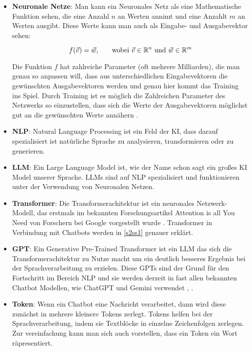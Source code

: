 	\begin{itemize}
		\item \textbf{Neuronale Netze}: Man kann ein Neuronales Netz als eine Mathematische Funktion sehen,
		die eine Anzahl $n$ an Werten annimt und eine Anzahlt $m$ an Werten ausgibt. Diese Werte kann man auch als Eingabe-
		und Ausgabevektor sehen: 		
		
		\begin{equation}\label{nueral_network_function}	
			f(\vec{v}) = \vec{w}\textnormal{,\qquad wobei } \vec{v} \in \mathbb{R}^n \textnormal{ und } \vec{w} \in \mathbb{R}^m
		\end{equation}  
		\vspace{0.0cm}
		
		Die Funktion $f$ hat zahlreiche Parameter (oft mehrere Milliarden), die man genau so anpassen will, dass aus unterschiedlichen 
		Eingabevektoren die gewünschten Ausgabevektoren werden und genau hier kommt das Training ins Spiel. Durch
		Training ist es möglich die Zahlreichen Parameter des Netzwerks so einzustellen, dass sich die Werte der 
		Ausgabevektoren möglichst gut an die gewünschten Werte annähern \cite[S. 4f]{aggarwal2018}.  
		
		\item \textbf{NLP}: Natural Language Processing ist ein Feld der KI, dass darauf spezialisiert ist natürliche 
		Sprache zu analysieren, transformieren oder zu generieren.  
		
		\item \textbf{LLM}: Ein Large Language Model ist, wie der Name schon sagt ein großes KI Model unserer Sprache.
		LLMs sind auf NLP spezialisiert und funktionieren unter der Verwendung von Neuronalen Netzen.

		\item \textbf{Transformer}: Die Transformerachitektur ist ein neuronales Netzwerk-Modell, das erstmals im 
		bekannten Forschungsartikel \glqq{}Attention is all You Need\grqq{} von Forschern bei Google vorgestellt wurde 
		\cite{vaswani2017}. Transformer in Verbindung mit Chatbots werden in \ref{s2ss1} genauer erklärt.
		
		\item \textbf{GPT}: Ein Generative Pre-Trained Transformer ist ein LLM das sich die Transformerachitektur 
		zu Nutze macht um ein deutlich besseres Ergebnis bei der Sprachverarbeitung zu erzielen. Diese GPTs sind
		der Grund für den Fortschritt im Bereich NLP und sie werden derzeit in fast allen bekannten Chatbot Modellen, 
		wie ChatGPT und Gemini verwendet \cite[S. 2]{gemini2024}, \cite[S. 1]{openAI2024}.  
		
		\item \textbf{Token}: Wenn ein Chatbot eine Nachricht verarbeitet, dann wird diese zunächst in mehrere kleinere 
		Tokens zerlegt. Tokens helfen bei der Sprachverarbeitung, indem sie Textblöcke in einzelne Zeichenfolgen zerlegen.  
		Zur vereinfachung kann man sich auch vorstellen, dass ein Token ein Wort räpresentiert.   
	\end{itemize}	
	\clearpage
	
